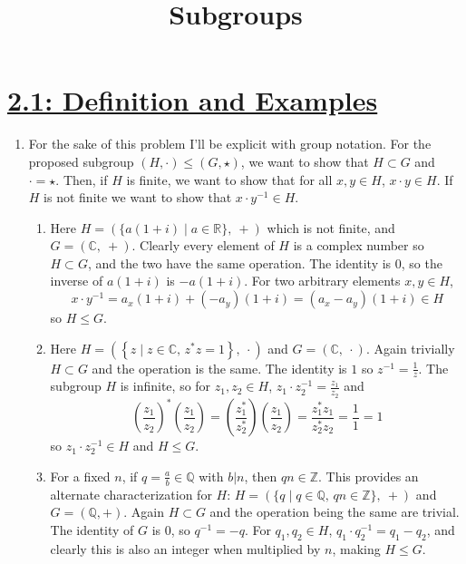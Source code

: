 \documentclass[]{article}
\title{Subgroups}
\author{}
\date{}
\newcommand{\bbz}{\mathbb{Z}}
\newcommand{\bbq}{\mathbb{Q}}
\newcommand{\bbr}{\mathbb{R}}
\newcommand{\bbc}{\mathbb{C}}
\begin{document}
\maketitle
\vspace{-5em}

\tableofcontents

\section*{\underline{2.1: Definition and Examples}}
\begin{enumerate}

\item For the sake of this problem I'll be explicit with group notation. For the proposed subgroup $(H,\cdot) \leq (G,\star)$, we want to show that $H \subset G$ and $\cdot = \star$. Then, if $H$ is finite, we want to show that for all $x,y\in H$, $x\cdot y \in H$. If $H$ is not finite we want to show that $x\cdot y^{-1} \in H$.
\begin{enumerate}
\item Here $H = \left( \{a(1+i)\mid a\in\bbr\},\ + \right)$ which is not finite, and $G = \left(\bbc,\ +\right)$. Clearly every element of $H$ is a complex number so $H \subset G$, and the two have the same operation. The identity is $0$, so the inverse of $a(1+i)$ is $-a(1+i)$. For two arbitrary elements $x,y\in H$,
\begin{equation}
x\cdot y^{-1} = a_x(1+i) + (-a_y)(1+i) = (a_x-a_y)(1+i) \in H
\end{equation}
so $H \leq G$.

\item Here $H = \left( \left\{z\mid z\in\bbc,\, z^*z=1\right\},\ \cdot \right)$ and $G = \left(\bbc,\ \cdot\right)$. Again trivially $H \subset G$ and the operation is the same. The identity is $1$ so $z^{-1} = \frac{1}{z}$. The subgroup $H$ is infinite, so for $z_1,z_2\in H$, $z_1\cdot z_2^{-1} = \frac{z_1}{z_2}$ and
\begin{equation}
\left( \frac{z_1}{z_2} \right)^* \left( \frac{z_1}{z_2} \right) = \left( \frac{z_1^*}{z_2^*} \right)\left( \frac{z_1}{z_2} \right) = \frac{z_1^*z_1}{z_2^*z_2} = \frac{1}{1} = 1
\end{equation}
so $z_1\cdot z_2^{-1} \in H$ and $H \leq G$.

\item For a fixed $n$, if $q = \frac{a}{b} \in \bbq$ with $b\vert n$, then $qn\in \bbz$. This provides an alternate characterization for $H$: $H = ( \{q\mid q\in\bbq ,\,qn\in\bbz \},\ + )$ and $G = (\bbq, +)$. Again $H \subset G$ and the operation being the same are trivial. The identity of $G$ is $0$, so $q^{-1} = -q$. For $q_1, q_2\in H$, $q_1\cdot q_2^{-1} = q_1-q_2$, and clearly this is also an integer when multiplied by $n$, making $H \leq G$.


\end{enumerate}
\end{enumerate}
\end{document}
